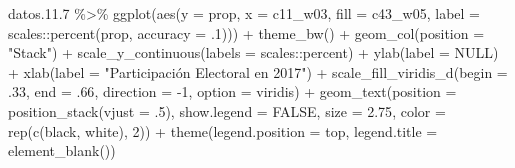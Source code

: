\documentclass[
  12pt,
]{book}
\newenvironment{Shaded}{\begin{snugshade}}{\end{snugshade}}
\newcommand{\AttributeTok}[1]{\textcolor[rgb]{0.77,0.63,0.00}{#1}}
\newcommand{\ConstantTok}[1]{\textcolor[rgb]{0.00,0.00,0.00}{#1}}
\newcommand{\DecValTok}[1]{\textcolor[rgb]{0.00,0.00,0.81}{#1}}
\newcommand{\FloatTok}[1]{\textcolor[rgb]{0.00,0.00,0.81}{#1}}
\newcommand{\FunctionTok}[1]{\textcolor[rgb]{0.00,0.00,0.00}{#1}}
\newcommand{\NormalTok}[1]{#1}
\newcommand{\SpecialCharTok}[1]{\textcolor[rgb]{0.00,0.00,0.00}{#1}}
\newcommand{\StringTok}[1]{\textcolor[rgb]{0.31,0.60,0.02}{#1}}
\begin{document}
\begin{Shaded}
\begin{Highlighting}[]
\NormalTok{datos.}\FloatTok{11.7} \SpecialCharTok{\%\textgreater{}\%} 
  \FunctionTok{ggplot}\NormalTok{(}\FunctionTok{aes}\NormalTok{(}\AttributeTok{y =}\NormalTok{ prop, }\AttributeTok{x =}\NormalTok{ c11\_w03, }\AttributeTok{fill =}\NormalTok{ c43\_w05, }
             \AttributeTok{label =}\NormalTok{ scales}\SpecialCharTok{::}\FunctionTok{percent}\NormalTok{(prop, }\AttributeTok{accuracy =}\NormalTok{ .}\DecValTok{1}\NormalTok{))) }\SpecialCharTok{+} 
  \FunctionTok{theme\_bw}\NormalTok{() }\SpecialCharTok{+} 
  \FunctionTok{geom\_col}\NormalTok{(}\AttributeTok{position =} \StringTok{"Stack"}\NormalTok{) }\SpecialCharTok{+}
  \FunctionTok{scale\_y\_continuous}\NormalTok{(}\AttributeTok{labels =}\NormalTok{ scales}\SpecialCharTok{::}\NormalTok{percent) }\SpecialCharTok{+} 
  \FunctionTok{ylab}\NormalTok{(}\AttributeTok{label =} \ConstantTok{NULL}\NormalTok{) }\SpecialCharTok{+}
  \FunctionTok{xlab}\NormalTok{(}\AttributeTok{label =} \StringTok{"Participación Electoral en 2017"}\NormalTok{) }\SpecialCharTok{+}
  \FunctionTok{scale\_fill\_viridis\_d}\NormalTok{(}\AttributeTok{begin =}\NormalTok{ .}\DecValTok{33}\NormalTok{, }\AttributeTok{end =}\NormalTok{ .}\DecValTok{66}\NormalTok{, }\AttributeTok{direction =} \SpecialCharTok{{-}}\DecValTok{1}\NormalTok{, }\AttributeTok{option =} \StringTok{\textquotesingle{}viridis\textquotesingle{}}\NormalTok{) }\SpecialCharTok{+} 
  \FunctionTok{geom\_text}\NormalTok{(}\AttributeTok{position =} \FunctionTok{position\_stack}\NormalTok{(}\AttributeTok{vjust =}\NormalTok{ .}\DecValTok{5}\NormalTok{),}
            \AttributeTok{show.legend =} \ConstantTok{FALSE}\NormalTok{,}
            \AttributeTok{size =} \FloatTok{2.75}\NormalTok{,}
            \AttributeTok{color =} \FunctionTok{rep}\NormalTok{(}\FunctionTok{c}\NormalTok{(}\StringTok{\textquotesingle{}black\textquotesingle{}}\NormalTok{, }\StringTok{\textquotesingle{}white\textquotesingle{}}\NormalTok{), }\DecValTok{2}\NormalTok{)) }\SpecialCharTok{+} 
  \FunctionTok{theme}\NormalTok{(}\AttributeTok{legend.position =} \StringTok{\textquotesingle{}top\textquotesingle{}}\NormalTok{,}
        \AttributeTok{legend.title =} \FunctionTok{element\_blank}\NormalTok{()) }
\end{Highlighting}
\end{Shaded}
\end{document}
